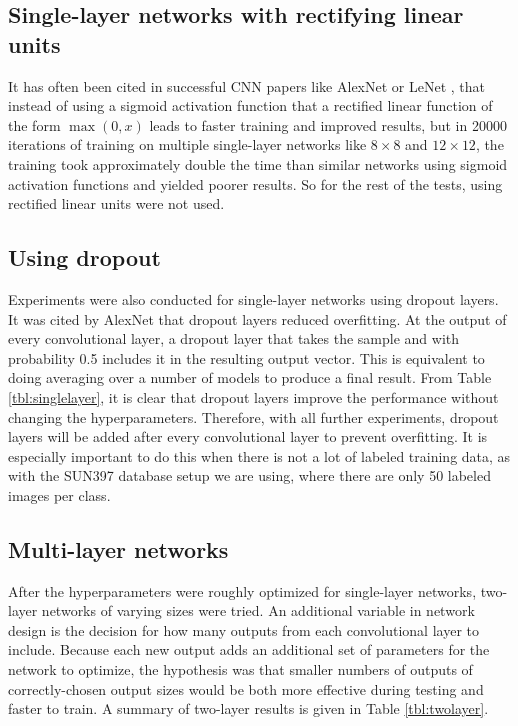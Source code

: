 \documentclass[10pt]{article}
\begin{document}
\subsection{Single-layer networks with rectifying linear units}

It has often been cited in successful CNN papers like AlexNet or LeNet \cite{krizhevsky_imagenet_2012}, \cite{lecun_handwritten_1990} that instead of using a sigmoid activation function that a rectified linear function of the form $\max(0, x)$ leads to faster training and improved results, but in 20000 iterations of training on multiple single-layer networks like $8 \times 8$ and $12 \times 12$, the training took approximately double the time than similar networks using sigmoid activation functions and yielded poorer results. So for the rest of the tests, using rectified linear units were not used.

\subsection{Using dropout}

Experiments were also conducted for single-layer networks using dropout layers. It was cited by AlexNet \cite{krizhevsky_imagenet_2012} that dropout layers reduced overfitting. At the output of every convolutional layer, a dropout layer that takes the sample and with probability 0.5 includes it in the resulting output vector. This is equivalent to doing averaging over a number of models to produce a final result. From Table \ref{tbl:singlelayer}, it is clear that dropout layers improve the performance without changing the hyperparameters. Therefore, with all further experiments, dropout layers will be added after every convolutional layer to prevent overfitting. It is especially important to do this when there is not a lot of labeled training data, as with the SUN397 database setup we are using, where there are only 50 labeled images per class.

\subsection{Multi-layer networks}

After the hyperparameters were roughly optimized for single-layer networks, two-layer networks of varying sizes were tried. An additional variable in network design is the decision for how many outputs from each convolutional layer to include. Because each new output adds an additional set of parameters for the network to optimize, the hypothesis was that smaller numbers of outputs of correctly-chosen output sizes would be both more effective during testing and faster to train. A summary of two-layer results is given in Table \ref{tbl:twolayer}.
\end{document}
